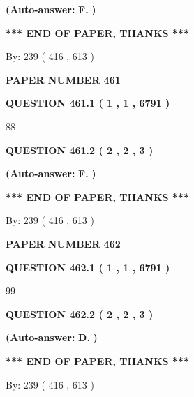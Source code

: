 \documentclass{ctexart}
\begin{document}
 
{\textbf{(Auto-answer:}}
{\textbf{\large{
F.}}}
{\textbf{)}}
 
 
   
   
   
   
\vspace{1.0in} 
{\textbf{\large{ *** END OF PAPER, THANKS *** }}} 
   
   
\hspace{1.0in} By: 
 239 ( 416 ,  613 )
   
   
   
   
\newpage 
\setcounter{page}{ 
   461001 } 
   
   
 {\textbf{ \Large{ PAPER NUMBER  461  }}}
   
   
   
   
  
  
{\textbf{\large{QUESTION
461.1 
 ( 1 , 1 , 6791 )
}}}

88
  
  
{\textbf{\large{QUESTION
461.2 
 ( 2 , 2 , 3 )
}}}
 
 
{\textbf{(Auto-answer:}}
{\textbf{\large{
F.}}}
{\textbf{)}}
 
 
   
   
   
   
\vspace{1.0in} 
{\textbf{\large{ *** END OF PAPER, THANKS *** }}} 
   
   
\hspace{1.0in} By: 
 239 ( 416 ,  613 )
   
   
   
   
\newpage 
\setcounter{page}{ 
   462001 } 
   
   
 {\textbf{ \Large{ PAPER NUMBER  462  }}}
   
   
   
   
  
  
{\textbf{\large{QUESTION
462.1 
 ( 1 , 1 , 6791 )
}}}

99
  
  
{\textbf{\large{QUESTION
462.2 
 ( 2 , 2 , 3 )
}}}
 
 
{\textbf{(Auto-answer:}}
{\textbf{\large{
D.}}}
{\textbf{)}}
 
 
   
   
   
   
\vspace{1.0in} 
{\textbf{\large{ *** END OF PAPER, THANKS *** }}} 
   
   
\hspace{1.0in} By: 
 239 ( 416 ,  613 )
   
   
   
\end{document}
